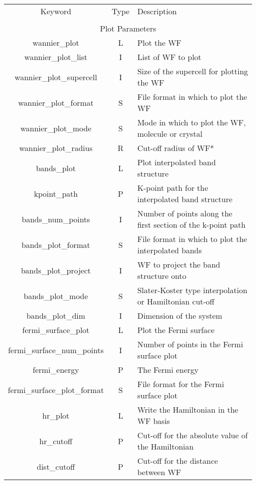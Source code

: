 \begin{table}
\begin{center}
\begin{tabular}{|c|c|p{6cm}|}
\hline
Keyword & Type & Description \\
        &      &             \\
\hline\hline
\multicolumn{3}{|c|}{Plot Parameters} \\
\hline
{\sc wannier\_plot }   & L & Plot the WF \\
{\sc wannier\_plot\_list } & I & List of WF to plot \\
{\sc wannier\_plot\_supercell }   & I & Size of the supercell for
plotting the WF \\
{\sc wannier\_plot\_format }   & S & File format in which to plot the
WF \\
{\sc wannier\_plot\_mode }   & S & Mode in which to plot the
WF, molecule or crystal \\ 
{\sc wannier\_plot\_radius } & R & Cut-off radius of WF* \\ 
{\sc bands\_plot }   & L & Plot interpolated band structure \\
{\sc kpoint\_path }   & P & K-point path for the interpolated band structure  \\
{\sc bands\_num\_points }   & I & Number of points along the first
section of the k-point path \\
{\sc bands\_plot\_format }   & S & File format in which to plot the
interpolated bands \\
{\sc bands\_plot\_project } & I & WF to project the band structure onto \\
{\sc bands\_plot\_mode }   & S & Slater-Koster type interpolation or
Hamiltonian cut-off \\
{\sc bands\_plot\_dim } & I & Dimension of the system \\
{\sc fermi\_surface\_plot }   & L & Plot the Fermi surface \\
{\sc fermi\_surface\_num\_points }   & I & Number of points in the Fermi
surface plot\\
{\sc fermi\_energy }   & P & The Fermi energy \\
{\sc fermi\_surface\_plot\_format }   & S & File format for the Fermi
surface plot \\
{\sc hr\_plot} & L & Write the Hamiltonian in the WF basis \\
{\sc hr\_cutoff} & P &  Cut-off for the absolute value of the Hamiltonian \\
{\sc dist\_cutoff} & P & Cut-off for the distance between WF \\

\end{tabular}
\end{center}
\end{table}
